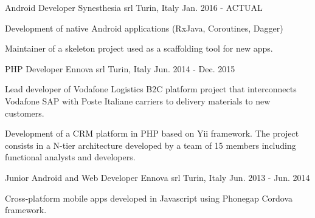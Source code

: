 


\begin{cventries}


\cventry
{Android Developer} %
{Synesthesia srl} %
{Turin, Italy} %
{Jan. 2016 - ACTUAL} %
{ %
	\begin{cvitems}
		\item {Development of native Android applications (RxJava, Coroutines, Dagger)}
		\item {Maintainer of a skeleton project used as a scaffolding tool for new apps.}
	\end{cvitems}
}


\cventry
{PHP Developer} %
{Ennova srl} %
{Turin, Italy} %
{Jun. 2014 - Dec. 2015} %
{ %
	\begin{cvitems}
		\item {Lead developer of Vodafone Logistics B2C platform project that interconnects Vodafone SAP with Poste Italiane carriers to delivery materials to new customers. }
		\item {Development of a CRM platform in PHP based on Yii framework. The project consists in a N-tier architecture developed by a team of 15 members including functional analysts and developers. }
	\end{cvitems}
}


\cventry
{Junior Android and Web Developer} %
{Ennova srl} %
{Turin, Italy} %
{Jun. 2013 - Jun. 2014} %
{ %
	\begin{cvitems}
		\item {Cross-platform mobile apps developed in Javascript using Phonegap Cordova framework.}
	\end{cvitems}
}


\end{cventries}